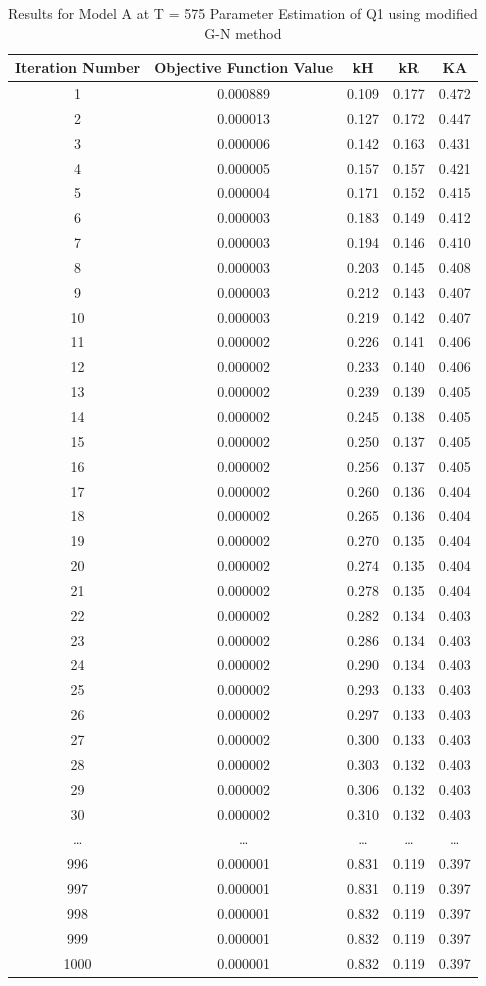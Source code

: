 \documentclass[a4paper,12pt]{article} %
\begin{document}
\begin{table}[ht]
    \caption{Results for Model A at T = 575 Parameter Estimation of Q1 using modified G-N method}
    \centering
    \begin{tabular}{|c|c|c|c|c|}
        \hline
        Iteration Number & Objective Function Value & kH & kR & KA \\
        \hline
        1 & 0.000889 & 0.109 & 0.177 & 0.472 \\
2 & 0.000013 & 0.127 & 0.172 & 0.447 \\
3 & 0.000006 & 0.142 & 0.163 & 0.431 \\
4 & 0.000005 & 0.157 & 0.157 & 0.421 \\
5 & 0.000004 & 0.171 & 0.152 & 0.415 \\
6 & 0.000003 & 0.183 & 0.149 & 0.412 \\
7 & 0.000003 & 0.194 & 0.146 & 0.410 \\
8 & 0.000003 & 0.203 & 0.145 & 0.408 \\
9 & 0.000003 & 0.212 & 0.143 & 0.407 \\
10 & 0.000003 & 0.219 & 0.142 & 0.407 \\
11 & 0.000002 & 0.226 & 0.141 & 0.406 \\
12 & 0.000002 & 0.233 & 0.140 & 0.406 \\
13 & 0.000002 & 0.239 & 0.139 & 0.405 \\
14 & 0.000002 & 0.245 & 0.138 & 0.405 \\
15 & 0.000002 & 0.250 & 0.137 & 0.405 \\
16 & 0.000002 & 0.256 & 0.137 & 0.405 \\
17 & 0.000002 & 0.260 & 0.136 & 0.404 \\
18 & 0.000002 & 0.265 & 0.136 & 0.404 \\
19 & 0.000002 & 0.270 & 0.135 & 0.404 \\
20 & 0.000002 & 0.274 & 0.135 & 0.404 \\
21 & 0.000002 & 0.278 & 0.135 & 0.404 \\
22 & 0.000002 & 0.282 & 0.134 & 0.403 \\
23 & 0.000002 & 0.286 & 0.134 & 0.403 \\
24 & 0.000002 & 0.290 & 0.134 & 0.403 \\
25 & 0.000002 & 0.293 & 0.133 & 0.403 \\
26 & 0.000002 & 0.297 & 0.133 & 0.403 \\
27 & 0.000002 & 0.300 & 0.133 & 0.403 \\
28 & 0.000002 & 0.303 & 0.132 & 0.403 \\
29 & 0.000002 & 0.306 & 0.132 & 0.403 \\
30 & 0.000002 & 0.310 & 0.132 & 0.403 \\
\ldots & \ldots & \ldots & \ldots & \ldots \\
996 & 0.000001 & 0.831 & 0.119 & 0.397 \\
997 & 0.000001 & 0.831 & 0.119 & 0.397 \\
998 & 0.000001 & 0.832 & 0.119 & 0.397 \\
999 & 0.000001 & 0.832 & 0.119 & 0.397 \\
1000 & 0.000001 & 0.832 & 0.119 & 0.397 \\


\end{tabular}
\end{table}
\end{document}
